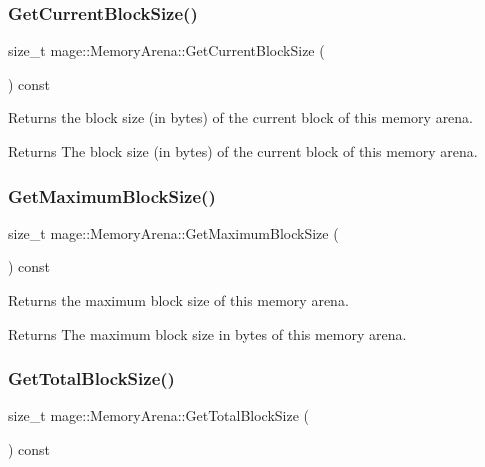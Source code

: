 \subsubsection{\texorpdfstring{Get\+Current\+Block\+Size()}{GetCurrentBlockSize()}}
{\footnotesize\ttfamily size\+\_\+t mage\+::\+Memory\+Arena\+::\+Get\+Current\+Block\+Size (\begin{DoxyParamCaption}{ }\end{DoxyParamCaption}) const\hspace{0.3cm}{\ttfamily [noexcept]}}

Returns the block size (in bytes) of the current block of this memory arena.

\begin{DoxyReturn}{Returns}
The block size (in bytes) of the current block of this memory arena. 
\end{DoxyReturn}
\hypertarget{classmage_1_1_memory_arena_a6786cf52a03777580b439cafdd8ff8f9}{}\label{classmage_1_1_memory_arena_a6786cf52a03777580b439cafdd8ff8f9} 
\subsubsection{\texorpdfstring{Get\+Maximum\+Block\+Size()}{GetMaximumBlockSize()}}
{\footnotesize\ttfamily size\+\_\+t mage\+::\+Memory\+Arena\+::\+Get\+Maximum\+Block\+Size (\begin{DoxyParamCaption}{ }\end{DoxyParamCaption}) const\hspace{0.3cm}{\ttfamily [noexcept]}}

Returns the maximum block size of this memory arena.

\begin{DoxyReturn}{Returns}
The maximum block size in bytes of this memory arena. 
\end{DoxyReturn}
\hypertarget{classmage_1_1_memory_arena_ac8e8ac4ba60cd2bb1d8dc8a5d4a9f4ad}{}\label{classmage_1_1_memory_arena_ac8e8ac4ba60cd2bb1d8dc8a5d4a9f4ad} 
\subsubsection{\texorpdfstring{Get\+Total\+Block\+Size()}{GetTotalBlockSize()}}
{\footnotesize\ttfamily size\+\_\+t mage\+::\+Memory\+Arena\+::\+Get\+Total\+Block\+Size (\begin{DoxyParamCaption}{ }\end{DoxyParamCaption}) const\hspace{0.3cm}{\ttfamily [noexcept]}}

